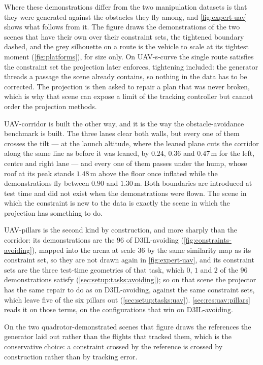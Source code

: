 Where these demonstrations differ from the two manipulation datasets is that they were generated against
the obstacles they fly among, and \autoref{fig:expert-uav} shows what follows from it. The figure draws
the demonstrations of the two scenes that have their own over their constraint sets, the tightened boundary dashed, and the grey silhouette
on a route is the vehicle to scale at its tightest moment (\autoref{fig:platforms}), for size only. On
UAV-s-curve the
single route satisfies the constraint set the projection later enforces, tightening included: the
generator threads a passage the scene already contains, so nothing in the data has to be corrected. The
projection is then asked to repair a plan that was never broken, which is why that scene can expose a
limit of the tracking controller but cannot order the projection methods.

UAV-corridor is built the other way, and it is the way the obstacle-avoidance benchmark is built. The three
lanes clear both walls, but every one of them crosses the tilt --- at the launch altitude, where the leaned
plane cuts the corridor along the same line as before it was leaned, by $0.24$, $0.36$ and $0.47$\,m for the
left, centre and right lane --- and every one of them passes under the hump, whose roof at its peak stands
$1.48$\,m above the floor once inflated while the demonstrations fly between $0.90$ and $1.30$\,m. Both
boundaries are introduced at test time and did not exist when the demonstrations were flown. The scene in
which the constraint is new to the data is exactly the scene in which the projection has something to do.

UAV-pillars is the second kind by construction, and more sharply than the corridor: its demonstrations are
the $96$ of D3IL-avoiding (\autoref{fig:constraints-avoiding}), mapped into the arena at scale $36$ by the
same similarity map as its constraint set, so they are not drawn again in \autoref{fig:expert-uav}, and
its constraint sets are the three test-time geometries of
that task, which $0$, $1$ and $2$ of the $96$ demonstrations satisfy (\autoref{sec:setup:tasks:avoiding});
so on that scene the projector has the same repair to do as on D3IL-avoiding, against the same constraint
sets, which leave five of the six pillars out (\autoref{sec:setup:tasks:uav}).
\autoref{sec:res:uav:pillars} reads it on those terms, on the configurations that win on D3IL-avoiding.

On the two quadrotor-demonstrated scenes that figure draws the references the generator laid out rather
than the flights that tracked them, which is the conservative choice: a constraint crossed by the reference is crossed by construction rather than
by tracking error.


